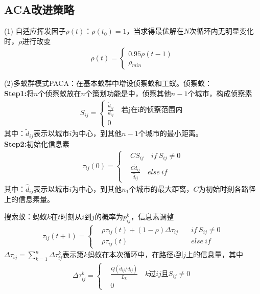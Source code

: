     \subsection{ACA改进策略}
        \par
        (1) 自适应挥发因子$\rho(t)$：$\rho(t_0)=1$，当求得最优解在$N$次循环内无明显变化时，$\rho $进行改变
        \begin{align*}
        \rho(t) = \left\{
        \begin{aligned}
        0.95\rho(t-1)\\
        \rho_{min}
        \end{aligned}
        \right.
        \end{align*}
        \par
        (2)多蚁群模式PACA：在基本蚁群中增设侦察蚁和工蚁。侦察蚁：\\
        \textbf{Step1:}将$n$个侦察蚁放在$n$个策划功能是中，侦察其他$n-1$个城市，构成侦察素
        \begin{align*}
        S_{ij} = \left\{
        \begin{aligned}
        \frac{\tilde{d}_{ij}}{d_{ij}} \quad\text{若j在i的侦察范围内}\\
        0
        \end{aligned}
        \right.
        \end{align*}
        其中：$\tilde{d}_{ij}$表示以城市$i$为中心，到其他$n-1$个城市的最小距离。\\
        \textbf{Step2:}初始化信息素
        \begin{align*}
        \tau_{ij}(0) = \left\{
        \begin{aligned}
        &CS_{ij} \quad if\  S_{ij} \neq 0\\
        &\frac{C\tilde{d}_{ij}}{\hat{d}_{ij}}\quad else\ if
        \end{aligned}
        \right.
        \end{align*}
        其中：$\hat{d}_{ij}$表示以城市$i$为中心，到其他$n_1$个城市的最大距离，$C$为初始时刻各路径上的信息素量。
        \par
        搜索蚁：蚂蚁$k$在$t$时刻从$i$到$j$的概率为$p_{ij}^k$，信息素调整
        \begin{align*}
        \tau_{ij}(t+1) = \left\{
        \begin{aligned}
        & \rho \tau_{ij}(t)+(1-\rho)\Delta\tau_{ij}&\quad if\ S_{ij} \neq 0\\
        & \rho \tau_{ij}(t) &\quad else \ if
        \end{aligned}
        \right.
        \end{align*}
        $\Delta\tau_{ij} = \sum_{k=1}^n\Delta\tau_{ij}^k$表示第$k$蚂蚁在本次循环中，在路径$i$到$j$上的信息量，其中
        \begin{align*}
        \Delta\tau_{ij}^k =\left\{
        \begin{aligned}
        & \frac{Q(\tilde{d}_{ij}/d_{ij})}{L_k} \quad k\text{过}ij\text{且}S_{ij}\neq 0\\
        & 0
        \end{aligned}
        \right.
        \end{align*}

